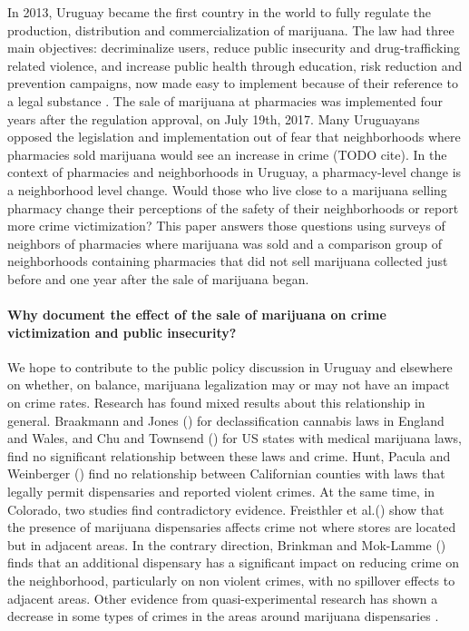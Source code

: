 \documentclass[11pt]{article}
\begin{document}
In 2013, Uruguay became the first country in the world to fully regulate the production, distribution and commercialization of marijuana. The law had three main objectives: decriminalize users, reduce public insecurity and drug-trafficking related violence, and increase public health through education, risk reduction and prevention campaigns, now made easy to implement because of their reference to a legal substance \citep{arraras2014inventando, pardo2014cannabis, queirolo2019uruguay}. The sale of marijuana at pharmacies was implemented four years after the regulation approval, on July 19th, 2017. Many Uruguayans opposed the legislation and implementation out of fear that neighborhoods where pharmacies sold marijuana would see an increase in crime (TODO cite). In the context of pharmacies and neighborhoods in Uruguay, a pharmacy-level change is a neighborhood level change. Would those who live close to a marijuana selling pharmacy change their perceptions of the safety of their neighborhoods or report more crime victimization?  This paper answers those questions using surveys of neighbors of pharmacies where marijuana was sold and a comparison group of neighborhoods containing pharmacies that did not sell marijuana collected just before and one year after the sale of marijuana began.

\paragraph{Why document the effect of the sale of marijuana on crime victimization and public insecurity?}

We hope to contribute to the public policy discussion in Uruguay and elsewhere on whether, on balance, marijuana legalization may or may not have an impact on crime rates. Research has found mixed results about this relationship in general. Braakmann and Jones (\citeyear{braakmann2014cannabis}) for declassification cannabis laws in England and Wales, and Chu and Townsend (\citeyear{chu2019joint}) for US states with medical marijuana laws, find no significant relationship between these laws and crime. Hunt, Pacula and Weinberger (\citeyear{hunt2018high}) find no relationship between Californian counties with laws that legally permit dispensaries and reported violent crimes. At the same time, in Colorado, two studies find contradictory evidence. Freisthler et al.(\citeyear{freisthler2016micro}) show that the presence of marijuana dispensaries affects crime not where stores are located but in adjacent areas. In the contrary direction, Brinkman and Mok-Lamme (\citeyear{brinkman2019not}) finds that an additional dispensary has a significant impact on reducing crime on the neighborhood, particularly on non violent crimes, with no spillover effects to adjacent areas.  Other evidence from  quasi-experimental research has shown a decrease in some types of crimes in the areas around marijuana dispensaries \citep{dragone2019crime, gavrilova2014legal, Indigo:2016}.
\end{document}
